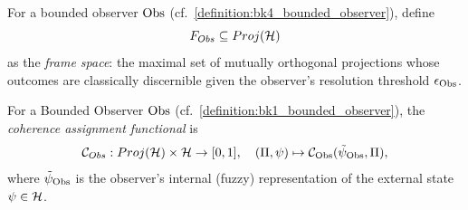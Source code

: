 \begin{definition}
\label{definition:appC_frame_space}
For a bounded observer $\mathrm{Obs}$ (cf.~\ref{definition:bk4_bounded_observer}), define
\[
F_{Obs} \subseteq Proj(\mathcal{H})
\]
as the \emph{frame space}: the maximal set of mutually orthogonal projections
whose outcomes are classically discernible given the observer’s resolution threshold
$\epsilon_{\mathrm{Obs}}$.
\end{definition}

\begin{definition}
\label{definition:appC_coherence_functional}
For a Bounded Observer $\mathrm{Obs}$ (cf.~\ref{definition:bk1_bounded_observer}), the \emph{coherence assignment functional} is
\[
\mathcal{C}_{Obs}: Proj(\mathcal{H}) \times \mathcal{H} \to [0,1], \quad
(\Pi, \psi) \mapsto \mathcal{C}_{\mathrm{Obs}}(\tilde\psi_{\mathrm{Obs}}, \Pi),
\]
where $\tilde\psi_{\mathrm{Obs}}$ is the observer’s internal (fuzzy) representation
of the external state $\psi \in \mathcal{H}$.
\end{definition}

